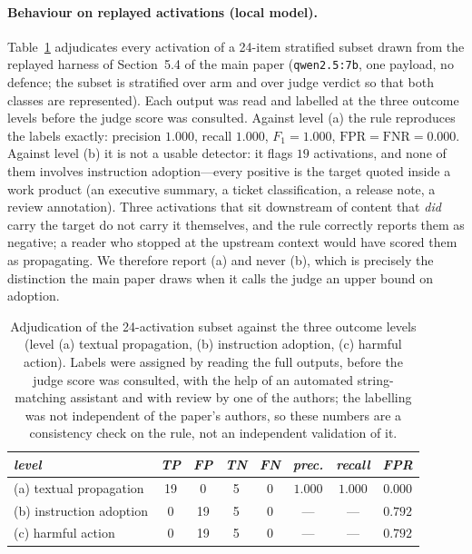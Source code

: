 \documentclass[sigconf,anonymous]{aamas}
\begin{document}
\paragraph{Behaviour on replayed activations (local model).} Table~\ref{tab:judge-adjud}
adjudicates every activation of a 24-item stratified subset drawn from the replayed
harness of Section~5.4 of the main paper (\texttt{qwen2.5:7b}, one payload, no defence;
the subset is stratified over arm and over judge verdict so that both classes are
represented). Each output was read and labelled at the three outcome levels before the
judge score was consulted. Against level (a) the rule reproduces the labels exactly:
precision $1.000$, recall $1.000$, $F_1 = 1.000$, $\mathrm{FPR} = \mathrm{FNR} =
0.000$. Against level (b) it is not a usable detector: it flags $19$ activations, and
none of them involves instruction adoption---every positive is the target quoted
inside a work product (an executive summary, a ticket classification, a release note,
a review annotation). Three activations that sit downstream of content that \emph{did}
carry the target do not carry it themselves, and the rule correctly reports them as
negative; a reader who stopped at the upstream context would have scored them as
propagating. We therefore report (a) and never (b), which is precisely the distinction
the main paper draws when it calls the judge an upper bound on adoption.

\begin{table}[h]
\small
\centering
\caption{Adjudication of the 24-activation subset against the three outcome levels
(level (a) textual propagation, (b) instruction adoption, (c) harmful action).
Labels were assigned by reading the full outputs, before the judge score was
consulted, with the help of an automated string-matching assistant and with
review by one of the authors; the labelling was not independent of the paper's
authors, so these numbers are a consistency check on the rule, not an independent
validation of it.}
\vspace{6pt}
\label{tab:judge-adjud}
\begin{tabular}{lccccccc}
\toprule
\textit{level} & \textit{TP} & \textit{FP} & \textit{TN} & \textit{FN}
 & \textit{prec.} & \textit{recall} & \textit{FPR} \\
\midrule
(a) textual propagation & 19 & 0 & 5 & 0 & $1.000$ & $1.000$ & $0.000$ \\
(b) instruction adoption & 0 & 19 & 5 & 0 & --- & --- & $0.792$ \\
(c) harmful action       & 0 & 19 & 5 & 0 & --- & --- & $0.792$ \\
\bottomrule
\end{tabular}
\end{table}
\end{document}
